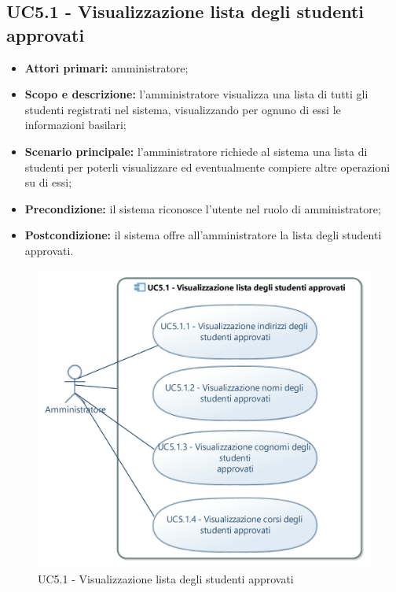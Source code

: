 \documentclass[AnalisiDeiRequisiti.tex]{subfiles}
\begin{document}

\subsection{UC5.1 - Visualizzazione lista degli studenti approvati}
\begin{itemize}
	\item \textbf{Attori primari:} amministratore;
	\item \textbf{Scopo e descrizione:} l'amministratore visualizza una lista di tutti gli studenti registrati nel sistema, visualizzando per ognuno di essi le informazioni basilari;
	\item \textbf{Scenario principale:} l'amministratore richiede al sistema una lista di studenti per poterli visualizzare ed eventualmente compiere altre operazioni su di essi;
	\item \textbf{Precondizione:} il sistema riconosce l'utente nel ruolo di amministratore; 
	\item \textbf{Postcondizione:} il sistema offre all'amministratore la lista degli studenti approvati.
\end{itemize}
\begin{figure}[H]
	\centering
	\includegraphics[width=0.9\linewidth]{UC5_1.jpg}
	\caption{UC5.1 - Visualizzazione lista degli studenti approvati}
	\label{fig:UC5.1 - Visualizzazione lista degli studenti approvati}
\end{figure}
\end{document}
